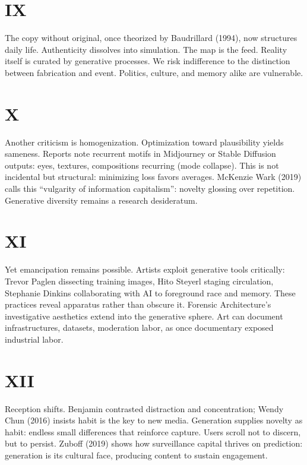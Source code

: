 \documentclass[12pt]{article}
\begin{document}
\section*{IX}

The copy without original, once theorized by Baudrillard (1994), now structures daily life. Authenticity dissolves into simulation. The map is the feed. Reality itself is curated by generative processes. We risk indifference to the distinction between fabrication and event. Politics, culture, and memory alike are vulnerable.

\section*{X}

Another criticism is homogenization. Optimization toward plausibility yields sameness. Reports note recurrent motifs in Midjourney or Stable Diffusion outputs: eyes, textures, compositions recurring (mode collapse). This is not incidental but structural: minimizing loss favors averages. McKenzie Wark (2019) calls this “vulgarity of information capitalism”: novelty glossing over repetition. Generative diversity remains a research desideratum.

\section*{XI}

Yet emancipation remains possible. Artists exploit generative tools critically: Trevor Paglen dissecting training images, Hito Steyerl staging circulation, Stephanie Dinkins collaborating with AI to foreground race and memory. These practices reveal apparatus rather than obscure it. Forensic Architecture’s investigative aesthetics extend into the generative sphere. Art can document infrastructures, datasets, moderation labor, as once documentary exposed industrial labor.

\section*{XII}

Reception shifts. Benjamin contrasted distraction and concentration; Wendy Chun (2016) insists habit is the key to new media. Generation supplies novelty as habit: endless small differences that reinforce capture. Users scroll not to discern, but to persist. Zuboff (2019) shows how surveillance capital thrives on prediction: generation is its cultural face, producing content to sustain engagement.
\end{document}
